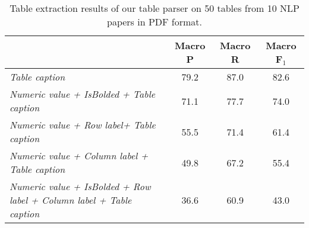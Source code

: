 \documentclass[11pt,a4paper]{article}
\begin{document}
\begin{table*}[t]
\begin{center}
\begin{small}
\begin{tabular}{lccc}
\hline
&Macro P&Macro R&Macro F$_1$\\ \hline
\emph{Table caption}&79.2&87.0&82.6 \\
\emph{Numeric value +  IsBolded + Table caption}&71.1&77.7&74.0 \\
\emph{Numeric value +  Row label+ Table caption}&55.5&71.4&61.4 \\
\emph{Numeric value  + Column label + Table caption}&49.8&67.2&55.4 \\
\emph{Numeric value + IsBolded + Row label + Column label + Table caption }&36.6&60.9&43.0 \\
 \hline
\end{tabular}
\end{small}
\end{center}
\caption{\label{tab:tableExt}  Table extraction results of our table parser on 50 tables from 10 NLP papers in PDF format.}
\end{table*}
\end{document}
